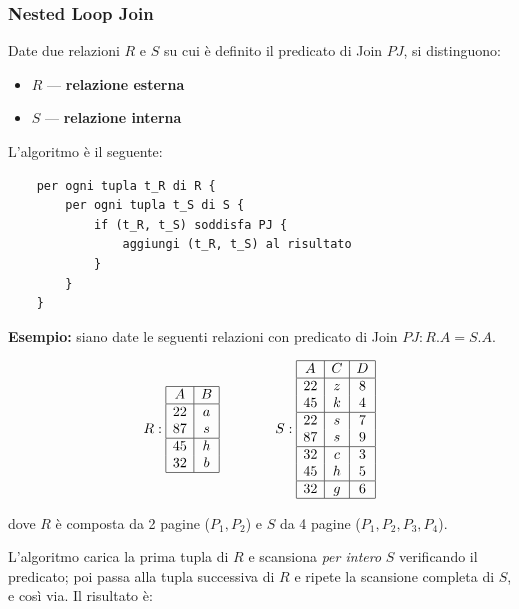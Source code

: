 \subsubsection{Nested Loop Join}

Date due relazioni $R$ e $S$ su cui è definito il predicato di Join $PJ$, si distinguono:
\begin{itemize}
	\item $R$ — \textbf{relazione esterna}
	\item $S$ — \textbf{relazione interna}
\end{itemize}

\bigskip
\noindent L'algoritmo è il seguente:

\begin{verbatim}
	per ogni tupla t_R di R {
		per ogni tupla t_S di S {
			if (t_R, t_S) soddisfa PJ {
				aggiungi (t_R, t_S) al risultato
			}
		}
	}
\end{verbatim}

\bigskip
\noindent\textbf{Esempio:} siano date le seguenti relazioni con predicato di Join $PJ: R.A = S.A$.

\[
R:
\begin{array}{|c|c|}
	\hline
	A & B \\
	\hline
	22 & a \\
	87 & s \\
	\hline
	45 & h \\
	32 & b \\
	\hline
\end{array}
\qquad\qquad
S:
\begin{array}{|c|c|c|}
	\hline
	A & C & D \\
	\hline
	22 & z & 8 \\
	45 & k & 4 \\
	\hline
	22 & s & 7 \\
	87 & s & 9 \\
	\hline
	32 & c & 3 \\
	45 & h & 5 \\
	\hline
	32 & g & 6 \\
	\hline
\end{array}
\]

\noindent dove $R$ è composta da 2 pagine ($P_1, P_2$) e $S$ da 4 pagine ($P_1, P_2, P_3, P_4$).

\bigskip
\noindent L'algoritmo carica la prima tupla di $R$ e scansiona \textit{per intero} $S$ verificando il predicato; poi passa alla tupla successiva di $R$ e ripete la scansione completa di $S$, e così via. Il risultato è:

